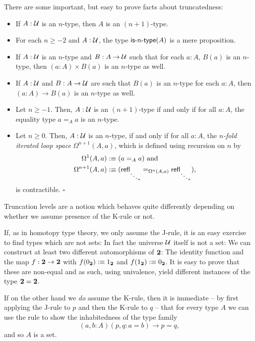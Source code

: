 There are some important, but easy to prove facts about truncatedness:
\begin{lemma}
\begin{itemize}
\item If $A : \mathcal{U}$ is an $n$-type, then $A$ is an $(n+1)$-type.
\item For each $n \geq -2$ and $A : \mathcal{U}$, the type $\mathsf{is}\mbox{-}{n}\mbox{-}\mathsf{type}(A)$ is a mere
proposition.
\item If $A : \mathcal{U}$ is an $n$-type and $B : A \to \mathcal{U}$ such that for each $a : A$,
$B(a)$ is an $n$-type, then $(a : A) \times B(a)$ is an $n$-type as well.
\item If $A : \mathcal{U}$ and $B : A \to \mathcal{U}$ are such that $B(a)$ is an $n$-type for each
$a : A$, then $(a : A) \to B(a)$ is an $n$-type as well.
\item Let $n \geq -1$. Then, $A : \mathcal{U}$ is an $(n+1)$-type if and only if for all $a : A$,
the equality type $a =_A a$ is an $n$-type.
\item Let $n \geq 0$. Then, $A : \mathcal{U}$ is an $n$-type, if and only if for all $a : A$,
the \emph{$n$-fold iterated loop space} $\Omega^{n+1}(A, a)$, which is defined using
recursion on $n$ by
\begin{align*}
\Omega^1(A, a) &:\equiv (a =_A a) \text{ and}\\
\Omega^{n+1}(A, a) &:\equiv (\mathsf{refl}_{\ddots_a} =_{\Omega^n(A,a)} \mathsf{refl}_{\ddots_a}) \text{,}
\end{align*}
is contractible. \hfill $\square$
\end{itemize}
\end{lemma}

\begin{remark}\label{rmk:tt-uip}
Truncation levels are a notion which behaves quite differently
depending on whether we assume presence of the K-rule or not.

If, as in homotopy type theory, we only assume the J-rule, it is an easy exercise
to find types which are not sets:
In fact the universe $\mathcal{U}$ itself is not a set:
We can construct
at least two different automorphisms of $\mathbf{2}$: The identity function
and the map $f : \mathbf{2} \to \mathbf{2}$ with $f(0_{\mathbf{2}}) :\equiv 1_{\mathbf{2}}$
and $f(1_{\mathbf{2}}) :\equiv 0_{\mathbf{2}}$.
It is easy to prove that these are non-equal and as such, using univalence,
yield different instances of the type $\mathbf{2} = \mathbf{2}$.

If on the other hand we \emph{do} assume the K-rule, then it is immediate
-- by first applying the J-rule to $p$ and then the K-rule to $q$ -- that
for every type $A$ we can use the rule to show the inhabitedness of the
type family
\begin{equation*}
(a, b : A) (p, q : a = b) \to p = q \text{,}
\end{equation*}
and so $A$ is a set.
\end{remark}


